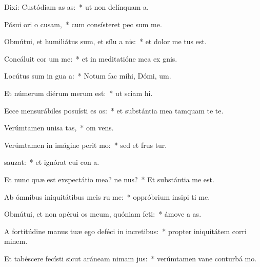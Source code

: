 \item Dixi: Custódiam as as:~* ut non delínquam   a.
\item Pósui ori o cusam,~* cum consísteret pec sum me.
\item Obmútui, et humiliátus sum, et sílu a nis:~* et dolor me tus est.
\item Concáluit cor um  me:~* et in meditatióne mea ex gnis.
\item Locútus sum in gua a:~* Notum fac mihi, Dómi,  um.
\item Et númerum diérum merum  est:~* ut sciam   hi.
\item Ecce mensurábiles posuísti es os:~* et substántia mea tamquam  te te.
\item Verúmtamen unisa tas,~* om  vens.
\item Verúmtamen in imágine perit mo:~* sed et frus tur.
\item {}sauzat:~* et ignórat cui con a.
\item Et nunc quæ est exspectátio mea? ne nus?~* Et substántia me   est.
\item Ab ómnibus iniquitátibus meis ru me:~* oppróbrium insipi ti me.
\item Obmútui, et non apérui os meum, quóniam  feti:~* ámove a   as.
\item A fortitúdine manus tuæ ego deféci in incretibus:~* propter iniquitátem corri minem.
\item Et tabéscere fecísti sicut aráneam nimam jus:~* verúmtamen vane conturbá  mo.
